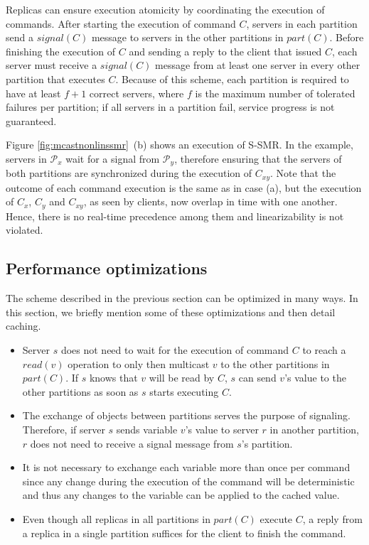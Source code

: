 \documentclass[11pt]{article}
\newcommand{\ppm}{\mathcal{P}}
\begin{document}
Replicas can ensure execution atomicity by coordinating the execution of commands.
After starting the execution of command $C$, servers in each partition send a $signal(C)$ message to servers in the other partitions in $part(C)$.
Before finishing the execution of $C$ and sending a reply to the client that issued $C$, each server must receive a $signal(C)$ message from at least one server in every other partition that executes $C$. 
Because of this scheme, each partition is required to have at least $f+1$ correct servers, where $f$ is the maximum number of tolerated failures per partition; if all servers in a partition fail, service progress is not guaranteed.

Figure \ref{fig:mcastnonlinssmr}~(b) shows an execution of S-SMR. 
In the example, servers in $\ppm_x$ wait for a signal from $\ppm_y$,
therefore ensuring that the servers of both partitions are synchronized during the execution of $C_{xy}$.
Note that the outcome of each command execution is the same as in case (a), but the execution of $C_x$, $C_y$ and $C_{xy}$, as seen by clients, now overlap in time with one another. 
Hence, there is no real-time precedence among them and linearizability is not violated.




\subsection{Performance optimizations}
\label{sec:optm}

The scheme described in the previous section can be optimized in many ways. 
In this section, we briefly mention some of these optimizations and then detail caching.
\begin{itemize}
\item Server $s$ does not need to wait for the execution of command $C$ to reach a $read(v)$ operation to only then multicast $v$ to the other partitions in $part(C)$. If $s$ knows that $v$ will be read by $C$, $s$ can send $v$'s value to the other partitions as soon as $s$ starts executing $C$.
\item The exchange of objects between partitions serves the purpose of signaling. Therefore, if server $s$ sends variable $v$'s value to server $r$ in another partition, $r$ does not need to receive a signal message from $s$'s partition.
\item It is not necessary to exchange each variable more than once per command since any change during the execution of the command will be deterministic and thus any changes to the variable can be applied to the cached value.
\item Even though all replicas in all partitions in $part(C)$ execute $C$, a reply from a replica in a single partition suffices for the client to finish the command.
\end{itemize}
\end{document}
